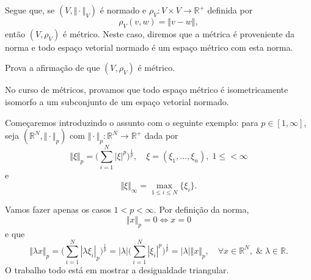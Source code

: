 \documentclass[../functional_analysis.tex]{subfiles}
\begin{document}
Segue que, se \((V, \Vert \cdot  \Vert_{V})\) é normado e \(\rho_{V}:V\times V\rightarrow \mathbb{R}^{+}\) definida por
\[
	\rho_{V}(v, w) = \Vert v-w \Vert,
\]
então \((V, \rho_{V})\) é métrico. Neste caso, diremos que a métrica é proveniente da norma e todo espaço vetorial normado é um espaço métrico com esta norma.
\begin{exr}
	Prova a afirmação de que \((V, \rho_V)\) é métrico.
\end{exr}
No curso de métricos, provamos que todo espaço métrico é isometricamente isomorfo a um subconjunto de um espaço vetorial normado.

Começaremos introduzindo o assunto com o seguinte exemplo: para \(p \in [1, \infty]\), seja \((\mathbb{R}^{N}, \Vert \cdot  \Vert_{p})\) com \(\Vert \cdot  \Vert_{p}:\mathbb{R}^{N}\rightarrow \mathbb{R}^{+}\) dada por
\[
	\Vert \xi  \Vert_{p} = \biggl(\sum\limits_{i=1}^{N}|\xi |^{p}\biggr)^{\frac{1}{p}},\quad \xi  = (\xi_1, \dotsc , \xi_n),\; 1\leq < \infty
\]
e
\[
	\Vert \xi  \Vert_{\infty} = \max\limits_{1\leq i\leq N}\{\xi_{i}\}.
\]

Vamos fazer apenas os casos \(1 < p < \infty\). Por definição da norma,
\[
	\Vert x \Vert_{p} = 0 \Longleftrightarrow x =0
\]
e que
\[
	\Vert \lambda x \Vert_p = \biggl(\sum\limits_{i=1}^{N}|\lambda \xi_{i}|_p\biggr)^{\frac{1}{p}} = |\lambda |\biggl(\sum\limits_{i=1}^{N}|\xi_{i}|^{p}\biggr)^{\frac{1}{p}} = |\lambda | \Vert x \Vert_p, \quad \forall x\in \mathbb{R}^{N},\;\&\; \lambda \in \mathbb{R}.
\]
O trabalho todo está em mostrar a desigualdade triangular.
\end{document}

